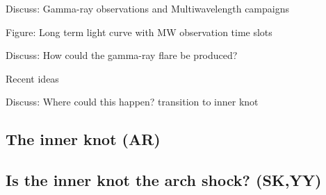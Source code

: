 Discuss: Gamma-ray observations and Multiwavelength campaigns

Figure: Long term light curve with MW observation time slots

Discuss: How could the gamma-ray flare be produced?

Recent ideas  \cite{2016arXiv160403179Y}\cite{2015arXiv151205426Z}\cite{2016arXiv160304850N}\cite{2016arXiv160305731L}

Discuss: Where could this happen? transition to inner knot

\subsection{The inner knot   (AR)}
\subsection{Is the inner knot the arch shock?                                      (SK,YY)}
